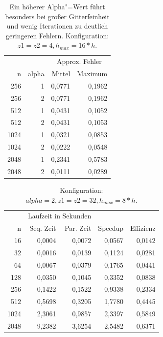 \documentclass[paper = a4]{scrartcl}
\begin{document}
\begin{table}
    \centering
    \begin{tabular}{|r|r|r|r|} \hline
    & & \multicolumn{2}{c|}{Approx. Fehler} \\
    n    & alpha & Mittel & Maximum \\ \hline \hline
    256  & 1     & 0,0771 & 0,1962  \\
    256  & 2     & 0,0771 & 0,1962  \\
    512  & 1     & 0,0431 & 0,1052  \\
    512  & 2     & 0,0431 & 0,1053  \\
    1024 & 1     & 0,0321 & 0,0853  \\
    1024 & 2     & 0,0222 & 0,0548  \\
    2048 & 1     & 0,2341 & 0,5783  \\
    2048 & 2     & 0,0111 & 0,0289  \\ \hline
    \end{tabular}
    \caption{Ein höherer Alpha"=Wert führt besonders bei großer Gitterfeinheit und wenig Iterationen zu deutlich geringeren Fehlern. Konfiguration: \(z1=z2=4, h_{max} = 16*h\).}
    \label{tab:c}
\end{table}

\begin{table}
    \centering
    \begin{tabular}{|r|r|r|r|r|} \hline
    & \multicolumn{2}{c|}{Laufzeit in Sekunden} & & \\
    n    & Seq. Zeit & Par. Zeit & Speedup & Effizienz \\ \hline \hline
    16   & 0,0004    & 0,0072    & 0,0567  & 0,0142    \\
    32   & 0,0016    & 0,0139    & 0,1124  & 0,0281    \\
    64   & 0,0067    & 0,0379    & 0,1765  & 0,0441    \\
    128  & 0,0350    & 0,1045    & 0,3352  & 0,0838    \\
    256  & 0,1422    & 0,1522    & 0,9338  & 0,2334    \\
    512  & 0,5698    & 0,3205    & 1,7780  & 0,4445    \\
    1024 & 2,3061    & 0,9857    & 2,3397  & 0,5849    \\
    2048 & 9,2382    & 3,6254    & 2,5482  & 0,6371    \\ \hline
    \end{tabular}
    \caption{Konfiguration: \(alpha=2, z1=z2=32, h_{max} = 8*h\).}
    \label{tab:e}
\end{table}
\end{document}

